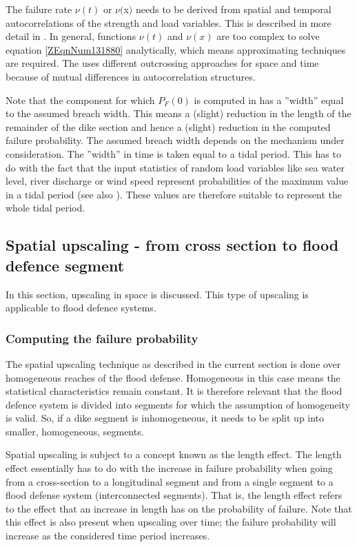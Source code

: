 {{The failure rate $\nu(t)$ or $\nu($x$)$ needs to be derived from spatial and temporal autocorrelations of the strength and load variables.
This is described in more detail in \cite{TechRef}.
In general, functions $\nu(t)$ and $\nu(x)$ are too complex to solve equation \eqref{ZEqnNum131880} analytically, which means approximating techniques are required.
The \probLib uses different outcrossing approaches for space and time because of mutual differences in autocorrelation structures.

Note that the component for which  $P_F(0)$ is computed in \probLib has a ''width'' equal to the assumed breach width.
This means a (slight) reduction in the length of the remainder of the dike section and hence a (slight) reduction in the computed failure probability.
The assumed breach width depends on the mechanism under consideration.
The ''width'' in time is taken equal to a tidal period.
This has to do with the fact that the input statistics of random load variables like sea water level, river discharge or wind speed represent probabilities of the maximum value in a tidal period (see also \cite{TechRef}).
These values are therefore suitable to represent the whole tidal period.}

\subsection{Spatial upscaling - from cross section to flood defence segment}\label{Section_2.5.5}
In this section, upscaling in space is discussed.
This type of upscaling is applicable to flood defence systems.

\subsubsection{Computing the failure probability}\label{Section_2.5.5.1}

The spatial upscaling technique as described in the current section is done over homogeneous reaches of the flood defense.
Homogeneous in this case means the statistical characteristics remain constant.
It is therefore relevant that the flood defence system is divided into segments for which the assumption of homogeneity is valid.
So, if a dike segment is inhomogeneous, it needs to be split up into smaller, homogeneous, segments.

Spatial upscaling is subject to a concept known as the length effect.
The length effect essentially has to do with the increase in failure probability when going from a cross-section to a longitudinal segment and from a single segment to a flood defense system (interconnected segments).
That is, the length effect refers to the effect that an increase in length has on the probability of failure.
Note that this effect is also present when upscaling over time; the failure probability will increase as the considered time period increases. 

}
